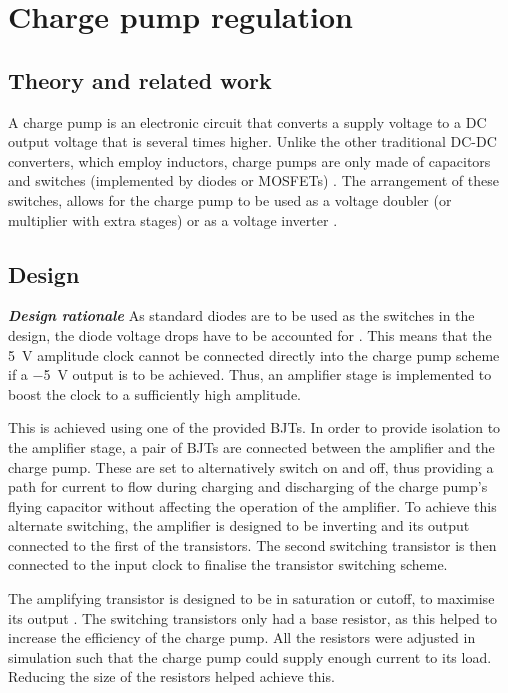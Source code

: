 \chapter{Charge pump regulation}
\section{Theory and related work} \label{sec:literature_chargepump}
A charge pump is an electronic circuit that converts a supply voltage to a DC output voltage that is several times higher. Unlike the other traditional DC-DC converters, which employ inductors, charge pumps are only made of capacitors and switches (implemented by diodes or MOSFETs) \cite{chargepump-article}. The arrangement of these switches, allows for the charge pump to be used as a voltage doubler (or multiplier with extra stages) or as a voltage inverter \cite{chargepump-main}.
\section{Design} \label{sec:design_chargepump}
\textbf{\textit{Design rationale}}
As standard diodes are to be used as the switches in the design, the diode voltage drops have to be accounted for \cite{chargepump-main}. This means that the \SI{5}{\volt} amplitude clock cannot be connected directly into the charge pump scheme if a \SI{-5}{\volt} output is to be achieved. Thus, an amplifier stage is implemented to boost the clock to a sufficiently high amplitude. 

This is achieved using one of the provided BJTs. In order to provide isolation to the amplifier stage, a pair of BJTs are connected between the amplifier and the charge pump. These are set to alternatively switch on and off, thus providing a path for current to flow during charging and discharging of the charge pump's flying capacitor without affecting the operation of the amplifier. To achieve this alternate switching, the amplifier is designed to be inverting and its output connected to the first of the transistors. The second switching transistor is then connected to the input clock to finalise the transistor switching scheme. 

The amplifying transistor is designed to be in saturation or cutoff, to maximise its output \cite{Neamen:Microelectronics}. The switching transistors only had a base resistor, as this helped to increase the efficiency of the charge pump. All the resistors were adjusted in simulation such that the charge pump could supply enough current to its load. Reducing the size of the resistors helped achieve this. 

